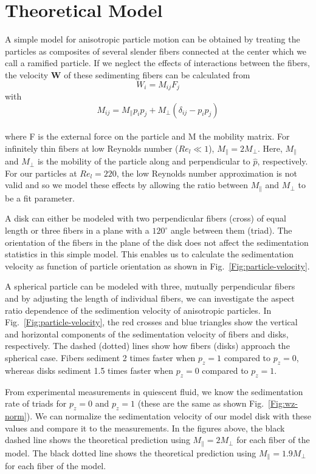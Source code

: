 \documentclass[]{jfm}
\begin{document}
\section{Theoretical Model}
A simple model for anisotropic particle motion can be obtained by treating the particles as composites of several slender fibers connected at the center which we call a ramified particle. If we neglect the effects of interactions between the fibers, the velocity $\mathbf{W}$ of these sedimenting fibers can be calculated from 
\begin{equation}
W_{i} = M_{ij}F_{j}
\end{equation}
with
\begin{equation}
M_{ij} = M_{\parallel}p_{i}p_{j} + M_{\perp}(\delta_{ij}-p_{i}p_{j})
\end{equation}
\\
where F is the external force on the particle and M the mobility matrix. For infinitely thin fibers at low Reynolds number ($\textit{Re}_l\ll1$), $M_{\parallel} = 2M_{\perp}$.
Here, $M_{\parallel}$ and $M_{\perp}$ is the mobility of the particle along and perpendicular to $\hat{p}$, respectively. For our particles at $\textit{Re}_l=220$, the low Reynolds number approximation is not valid and so we model these effects by allowing the ratio between $M_{\parallel}$ and $M_{\perp}$ to be a fit parameter. 

A disk can either be modeled with two perpendicular fibers (cross) of equal length or three fibers in a plane with a $120^{\circ}$ angle between them (triad). The orientation of the fibers in the plane of the disk does not affect the sedimentation statistics in this simple model. This enables us to calculate the sedimentation velocity as function of particle orientation as shown in Fig.~\ref{Fig:particle-velocity}. 

A spherical particle can be modeled with three, mutually perpendicular fibers and by adjusting the length of individual fibers, we can investigate the aspect ratio dependence of the sedimention velocity of anisotropic particles. In Fig.~\ref{Fig:particle-velocity}, the red crosses and blue triangles show the vertical and horizontal components of the sedimentation velocity of fibers and disks, respectively. The dashed (dotted) lines show how fibers (disks) approach the spherical case.  Fibers sediment 2 times faster when $p_z{=}1$ compared to $p_z{=}0$, whereas disks sediment 1.5 times faster when $p_z{=}0$ compared to $p_z{=}1$.

From experimental measurements in quiescent fluid, we know the sedimentation rate of triads for $p_z{=}0$ and $p_z{=}1$ (these are the same as shown Fig.~\ref{Fig:wz-norm}). We can normalize the sedimentation velocity of our model disk with these values and compare it to the measurements. In the figures above, the black dashed line shows the theoretical prediction using $M_{\parallel} = 2M_{\perp}$ for each fiber of the model. The black dotted line shows the theoretical prediction using $M_{\parallel} = 1.9M_{\perp}$ for each fiber of the model.
\end{document}
